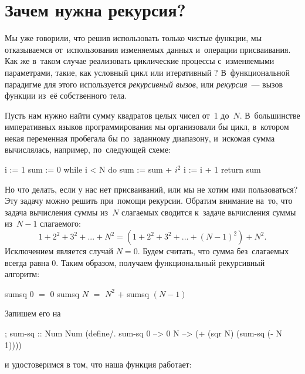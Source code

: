 \label{Less:recursion}



\section{Зачем нужна рекурсия?}%
Мы уже говорили, что решив использовать только чистые функции, мы отказываемся от~использования изменяемых данных и~операции присваивания. Как же в~таком случае реализовать циклические процессы с~изменяемыми параметрами, такие, как условный цикл  или итеративный ? В~функциональной парадигме для этого используется \emph{рекурсивный вызов}, или \emph{рекурсия}~--- вызов функции из~её собственного тела.

Пусть нам нужно найти сумму квадратов целых чисел от~1 до~$N$. В~большинстве императивных языков программирования мы организовали бы цикл, в~котором некая переменная пробегала бы по~заданному диапазону, и~искомая сумма вычислялась, например, по~следующей схеме:

\label{while}
\begin{PseudoCode}[emph={i,sum,N}]
  i := 1
  sum := 0
  while i < N do
    sum := sum + $i^2$
    i := i + 1
  return sum
\end{PseudoCode}

Но что делать, если у нас нет присваиваний, или мы не хотим ими пользоваться? Эту задачу можно решить при~помощи рекурсии. Обратим внимание на~то, что задача вычисления суммы из~$N$ слагаемых сводится к~задаче вычисления суммы из~$N-1$ слагаемого:
\begin{equation*}
1 + 2^2 + 3^2 +... + N^2 = (1 + 2^2 + 3^2 +... + (N-1)^2) + N^2.
\end{equation*}
Исключением является случай $N = 0$. Будем считать, что сумма без~слагаемых всегда равна 0. Таким образом, получаем функциональный рекурсивный алгоритм:\label{sumsq}
\begin{SchemeCode}
  sumsq $0$ $=$ $0$
  sumsq $N$ $=$ $N^2$ $+$ sumsq $(N-1)$
\end{SchemeCode}
Запишем его на~\Scheme

\begin{Definition}[emph=N]
; sum-sq :: Num \arrow Num
(define/. sum-sq
  0 --> 0
  N --> (+ (sqr N) (sum-sq (- N 1))))
\end{Definition}
и удостоверимся в том, что наша функция работает:

